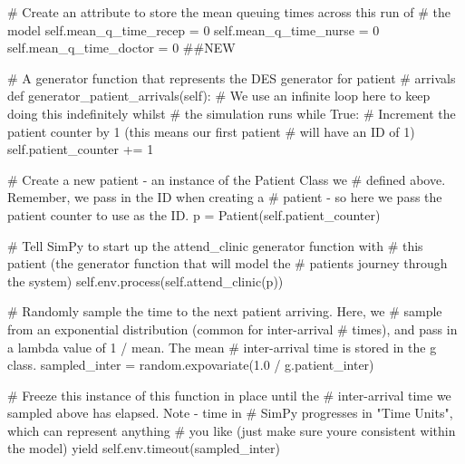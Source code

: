 \documentclass[
  letterpaper,
  DIV=11,
  numbers=noendperiod]{scrreprt}
\newenvironment{Shaded}{\begin{snugshade}}{\end{snugshade}}
\newcommand{\CommentTok}[1]{\textcolor[rgb]{0.37,0.37,0.37}{#1}}
\newcommand{\ControlFlowTok}[1]{\textcolor[rgb]{0.00,0.23,0.31}{#1}}
\newcommand{\DecValTok}[1]{\textcolor[rgb]{0.68,0.00,0.00}{#1}}
\newcommand{\FloatTok}[1]{\textcolor[rgb]{0.68,0.00,0.00}{#1}}
\newcommand{\KeywordTok}[1]{\textcolor[rgb]{0.00,0.23,0.31}{#1}}
\newcommand{\NormalTok}[1]{\textcolor[rgb]{0.00,0.23,0.31}{#1}}
\newcommand{\OperatorTok}[1]{\textcolor[rgb]{0.37,0.37,0.37}{#1}}
\newcommand{\VariableTok}[1]{\textcolor[rgb]{0.07,0.07,0.07}{#1}}
\begin{document}
\begin{tcolorbox}
\begin{Shaded}
\begin{Highlighting}[]
        \CommentTok{\# Create an attribute to store the mean queuing times across this run of}
        \CommentTok{\# the model}
        \VariableTok{self}\NormalTok{.mean\_q\_time\_recep }\OperatorTok{=} \DecValTok{0}
        \VariableTok{self}\NormalTok{.mean\_q\_time\_nurse }\OperatorTok{=} \DecValTok{0}
        \VariableTok{self}\NormalTok{.mean\_q\_time\_doctor }\OperatorTok{=} \DecValTok{0} \CommentTok{\#\#NEW}

    \CommentTok{\# A generator function that represents the DES generator for patient}
    \CommentTok{\# arrivals}
    \KeywordTok{def}\NormalTok{ generator\_patient\_arrivals(}\VariableTok{self}\NormalTok{):}
        \CommentTok{\# We use an infinite loop here to keep doing this indefinitely whilst}
        \CommentTok{\# the simulation runs}
        \ControlFlowTok{while} \VariableTok{True}\NormalTok{:}
            \CommentTok{\# Increment the patient counter by 1 (this means our first patient}
            \CommentTok{\# will have an ID of 1)}
            \VariableTok{self}\NormalTok{.patient\_counter }\OperatorTok{+=} \DecValTok{1}

            \CommentTok{\# Create a new patient {-} an instance of the Patient Class we}
            \CommentTok{\# defined above.  Remember, we pass in the ID when creating a}
            \CommentTok{\# patient {-} so here we pass the patient counter to use as the ID.}
\NormalTok{            p }\OperatorTok{=}\NormalTok{ Patient(}\VariableTok{self}\NormalTok{.patient\_counter)}

            \CommentTok{\# Tell SimPy to start up the attend\_clinic generator function with}
            \CommentTok{\# this patient (the generator function that will model the}
            \CommentTok{\# patient\textquotesingle{}s journey through the system)}
            \VariableTok{self}\NormalTok{.env.process(}\VariableTok{self}\NormalTok{.attend\_clinic(p))}

            \CommentTok{\# Randomly sample the time to the next patient arriving.  Here, we}
            \CommentTok{\# sample from an exponential distribution (common for inter{-}arrival}
            \CommentTok{\# times), and pass in a lambda value of 1 / mean.  The mean}
            \CommentTok{\# inter{-}arrival time is stored in the g class.}
\NormalTok{            sampled\_inter }\OperatorTok{=}\NormalTok{ random.expovariate(}\FloatTok{1.0} \OperatorTok{/}\NormalTok{ g.patient\_inter)}

            \CommentTok{\# Freeze this instance of this function in place until the}
            \CommentTok{\# inter{-}arrival time we sampled above has elapsed.  Note {-} time in}
            \CommentTok{\# SimPy progresses in "Time Units", which can represent anything}
            \CommentTok{\# you like (just make sure you\textquotesingle{}re consistent within the model)}
            \ControlFlowTok{yield} \VariableTok{self}\NormalTok{.env.timeout(sampled\_inter)}


\end{Highlighting}
\end{Shaded}
\end{tcolorbox}
\end{document}
